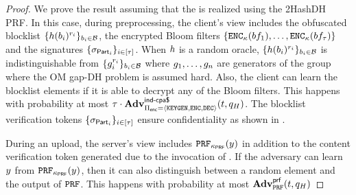 \begin{proof}

We prove the result assuming that the \oprfFunc is realized using the 2HashDH PRF. In this case, during preprocessing, 
the client's view includes the obfuscated blocklist  $\{ \hashFn(\genericBlocklistElmt[\setIdx])^{\genericRand[\setIdx]}\}_{\genericBlocklistElmt[\setIdx] \in \blocklist}$, the encrypted Bloom filters $\{\encrypt[\genericSymmKey](\bloomFilter[1]), \dots, \encrypt[\genericSymmKey](\bloomFilter[\numBlocklistParts])\}$ and the signatures $\{ \genericSig[\partition{\setIdx}] \}_{\setIdx \in \nats[\numBlocklistParts]}$. When $\hashFn$ is a random oracle, $\{ \hashFn(\genericBlocklistElmt[\setIdx])^{\genericRand[\setIdx]}\}_{\genericBlocklistElmt[\setIdx] \in \blocklist}$ is indistinguishable from 
$\{\qrGen_\setIdx^{\genericRand[\setIdx]}\}_{\genericBlocklistElmt[\setIdx] \in \blocklist}$ where $g_1, \dots, g_n$ are generators of the group \group where the OM gap-DH problem is assumed hard. Also, the client can learn the blocklist elements if it is able to decrypt any of the Bloom filters. This happens with probability at most $\numBlocklistParts \cdot \Advantage{\indcpaRandLabel}{\encryptionSchemeDefn}(\timeBound, \oracleQueries)$. 
The blocklist verification tokens $\{ \genericSig[\partition{\setIdx}] \}_{\setIdx \in \nats[\numBlocklistParts]}$ ensure confidentiality as shown in . 

During an upload, the server's view includes $\prf{\prfKey}(\genericCInputElmt)$ in addition to the content verification token generated due to the 
invocation of \protocolEM. If the adversary can learn $\genericCInputElmt$ from $\prf{\prfKey}(\genericCInputElmt)$, then it can also distinguish between a random element and the output of $\prf$. This happens with probability at most $\Advantage{\prfLabel}{\prf}(\timeBound, \oracleQueries)$

\end{proof}



